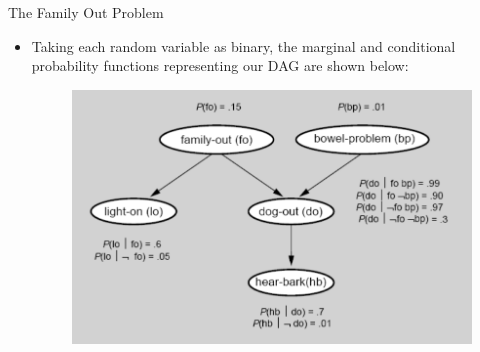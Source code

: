 \documentclass[handout]{beamer}
\begin{document}
\begin{frame}{The Family Out Problem}
\scriptsize{



\begin{itemize}
\item Taking each random variable as binary, the marginal and conditional probability functions representing our DAG are shown below: 


 \begin{figure}[h!]
	\centering
	\includegraphics[scale=0.4]{pics/fodagProb.png}
	\end{figure} 






 
\end{itemize}



} 

\end{frame}
\end{document}
